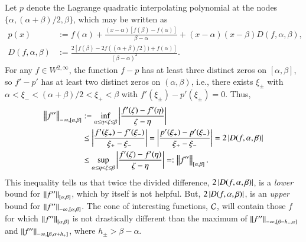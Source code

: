 \documentclass[review]{elsarticle}
\theoremstyle{definition}
\renewcommand{\cw}{W}
\begin{document}
Let $p$ denote the Lagrange quadratic interpolating polynomial at the nodes
$\{\alpha, (\alpha + \beta)/2, \beta\}$, which may be written as
\begin{align}
\nonumber
   p(x) & := f(\alpha) + \frac{(x-\alpha)[f(\beta) - f(\alpha)]}{\beta - \alpha}  + 
   (x-\alpha)(x-\beta) D(f,\alpha,\beta), 
\\ D(f,\alpha,\beta) &:= \frac{2[f(\beta) - 2f((\alpha + \beta)/2)) 
	+ f(\alpha)]}{(\beta - \alpha)^2}. \label{divdiffdef}
\end{align}
For any $f \in \cw^{2,\infty}$, the function $f - p$ has at least three distinct
zeros on $[\alpha,\beta]$, so $f' - p'$ has at least two distinct zeros on
$(\alpha,\beta)$, i.e., there exists $\xi_\pm$ with $\alpha < \xi_- < (\alpha +
\beta)/2 < \xi_+ < \beta$ with $f'(\xi_\pm) - p'(\xi_{\pm}) = 0$. Thus,
\begin{align} \label{NDDbdm}
     \norm[-\infty,{[\alpha,\beta]}]{f''} 
   & := \inf_{\alpha \le \eta < \zeta \le \beta} \abs{\frac{f'(\zeta) - f'(\eta)}{\zeta - \eta}} 
   \nonumber
\\ & \le \abs{\frac{f'(\xi_+) - f'(\xi_-)}{\xi_+ - \xi_-}} 
   = \abs{\frac{p'(\xi_+) - p'(\xi_-)}{\xi_+ - \xi_-}} = 2 \abs{D(f,\alpha,\beta)}  \nonumber
\\ & \le \sup_{\alpha \le \eta < \zeta \le \beta} \abs{\frac{f'(\zeta) - f'(\eta)}{\zeta - \eta}} 
=: \norm[{[\alpha,\beta]}]{f''}.
\end{align}
This inequality tells us that twice the divided difference,
$2\abs{D(f,\alpha,\beta)}$, is a \emph{lower} bound for
$\norm[{[\alpha,\beta]}]{f''}$, which by itself is not helpful. But,
$2\abs{D(f,\alpha,\beta)}$, is an \emph{upper} bound for
$\norm[-\infty,{[\alpha,\beta]}]{f''}$. The cone of interesting functions,
$\cc$, will contain those $f$ for which $\norm[{[\alpha,\beta]}]{f''}$ is not
drastically different than the maximum of $\norm[-\infty,{[\beta - h_-,
\alpha]}]{f''}$ and $\norm[-\infty,{[\beta, \alpha+ h_+]}]{f''}$, where $h_{\pm} > \beta - 
\alpha$.
\end{document}
